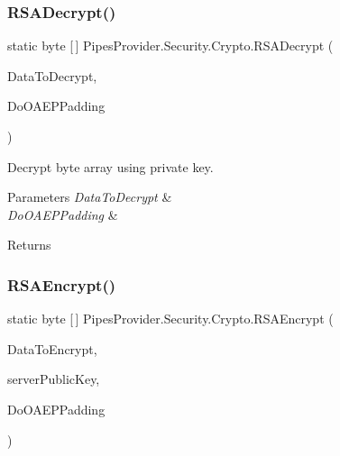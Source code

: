 \subsubsection{\texorpdfstring{R\+S\+A\+Decrypt()}{RSADecrypt()}}
{\footnotesize\ttfamily static byte \mbox{[}$\,$\mbox{]} Pipes\+Provider.\+Security.\+Crypto.\+R\+S\+A\+Decrypt (\begin{DoxyParamCaption}\item[{byte \mbox{[}$\,$\mbox{]}}]{Data\+To\+Decrypt,  }\item[{bool}]{Do\+O\+A\+E\+P\+Padding }\end{DoxyParamCaption})\hspace{0.3cm}{\ttfamily [static]}}



Decrypt byte array using private key. 


\begin{DoxyParams}{Parameters}
{\em Data\+To\+Decrypt} & \\
\hline
{\em Do\+O\+A\+E\+P\+Padding} & \\
\hline
\end{DoxyParams}
\begin{DoxyReturn}{Returns}

\end{DoxyReturn}
\mbox{\label{class_pipes_provider_1_1_security_1_1_crypto_a09f2c39c0c97bf871f3ab9df2f1a40fd}} 
\subsubsection{\texorpdfstring{R\+S\+A\+Encrypt()}{RSAEncrypt()}}
{\footnotesize\ttfamily static byte \mbox{[}$\,$\mbox{]} Pipes\+Provider.\+Security.\+Crypto.\+R\+S\+A\+Encrypt (\begin{DoxyParamCaption}\item[{byte \mbox{[}$\,$\mbox{]}}]{Data\+To\+Encrypt,  }\item[{R\+S\+A\+Parameters}]{server\+Public\+Key,  }\item[{bool}]{Do\+O\+A\+E\+P\+Padding }\end{DoxyParamCaption})\hspace{0.3cm}{\ttfamily [static]}}



